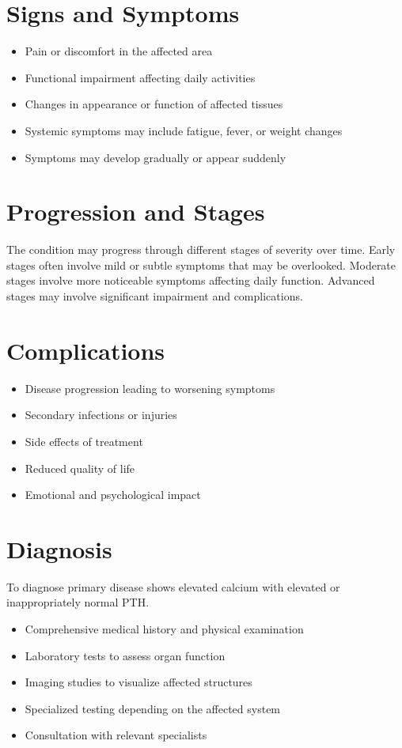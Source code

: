 \section{Signs and Symptoms}
\begin{itemize}[noitemsep]
  \item Pain or discomfort in the affected area
  \item Functional impairment affecting daily activities
  \item Changes in appearance or function of affected tissues
  \item Systemic symptoms may include fatigue, fever, or weight changes
  \item Symptoms may develop gradually or appear suddenly
\end{itemize}
\section{Progression and Stages}
The condition may progress through different stages of severity over time. Early stages often involve mild or subtle symptoms that may be overlooked. Moderate stages involve more noticeable symptoms affecting daily function. Advanced stages may involve significant impairment and complications.
\section{Complications}
\begin{itemize}[noitemsep]
  \item Disease progression leading to worsening symptoms
  \item Secondary infections or injuries
  \item Side effects of treatment
  \item Reduced quality of life
  \item Emotional and psychological impact
\end{itemize}
\section{Diagnosis}
To diagnose primary disease shows elevated calcium with elevated or inappropriately normal PTH.

\begin{itemize}[noitemsep]
  \item Comprehensive medical history and physical examination
  \item Laboratory tests to assess organ function
  \item Imaging studies to visualize affected structures
  \item Specialized testing depending on the affected system
  \item Consultation with relevant specialists
\end{itemize}
